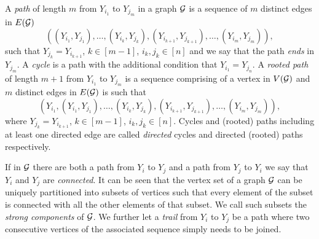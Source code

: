 A \textit{path} of length $m$ from $Y_{i_1}$ to $Y_{j_m}$ in a graph $\mathcal{G}$ is a sequence of $m$ distinct edges in $E(\mathcal{G})$
\begin{equation*}
((Y_{i_1},Y_{j_1}),\dots, (Y_{i_k},Y_{j_k}),(Y_{i_{k+1}},Y_{j_{k+1}}),\dots,(Y_{i_m},Y_{j_m})),
\end{equation*}
 such that $Y_{j_k}=Y_{i_{k+1}}$, $k\in[m-1]$, $i_k,j_k\in[n]$ and we say that the path \textit{ends} in $Y_{j_m}$. A \textit{cycle} is a path  with the additional condition that $Y_{i_1}=Y_{j_n}$. A \textit{rooted path} of length $m+1$ from $Y_{i_1}$ to $Y_{j_m}$ is a sequence comprising of a vertex in $V(\mathcal{G})$ and $m$ distinct edges in $E(\mathcal{G})$ is such that
\begin{equation*}
(Y_{i_1},(Y_{i_1},Y_{j_1}),\dots, (Y_{i_k},Y_{j_k}),(Y_{i_{k+1}},Y_{j_{k+1}}),\dots,(Y_{i_m},Y_{j_m})),
\end{equation*} 
 where $Y_{j_k}=Y_{i_{k+1}}$, $k\in[m-1]$, $i_k,j_k\in[n]$. Cycles and (rooted) paths including at least one directed edge are called \textit{directed} cycles and directed (rooted) paths respectively.
 
If in $\mathcal{G}$ there are both a path from $Y_i$ to $Y_j$ and a path from $Y_j$ to $Y_i$ we say that $Y_i$ and $Y_j$ are  \textit{connected}. It can be seen that the vertex set of a graph $\mathcal{G}$ can be uniquely partitioned into subsets of vertices such that every element of the subset is connected with all the other elements of that subset. We call such subsets the \textit{strong components} of $\mathcal{G}$. We further let a \textit{trail} from $Y_i$ to $Y_j$ be a path where two consecutive vertices  of the associated sequence simply needs to be joined.


